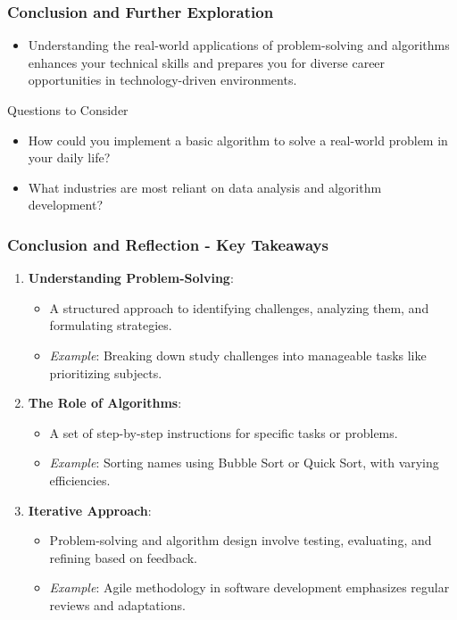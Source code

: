 \documentclass{beamer}
\begin{document}
\begin{frame}[fragile]
    \frametitle{Conclusion and Further Exploration}
    \begin{itemize}
        \item Understanding the real-world applications of problem-solving and algorithms enhances your technical skills and prepares you for diverse career opportunities in technology-driven environments.
    \end{itemize}
    
    \begin{block}{Questions to Consider}
        \begin{itemize}
            \item How could you implement a basic algorithm to solve a real-world problem in your daily life?
            \item What industries are most reliant on data analysis and algorithm development?
        \end{itemize}
    \end{block}
\end{frame}

\begin{frame}[fragile]
    \frametitle{Conclusion and Reflection - Key Takeaways}
    \begin{enumerate}
        \item \textbf{Understanding Problem-Solving}:
        \begin{itemize}
            \item A structured approach to identifying challenges, analyzing them, and formulating strategies.
            \item \textit{Example}: Breaking down study challenges into manageable tasks like prioritizing subjects.
        \end{itemize}
        
        \item \textbf{The Role of Algorithms}:
        \begin{itemize}
            \item A set of step-by-step instructions for specific tasks or problems.
            \item \textit{Example}: Sorting names using Bubble Sort or Quick Sort, with varying efficiencies.
        \end{itemize}
        
        \item \textbf{Iterative Approach}:
        \begin{itemize}
            \item Problem-solving and algorithm design involve testing, evaluating, and refining based on feedback.
            \item \textit{Example}: Agile methodology in software development emphasizes regular reviews and adaptations.
        \end{itemize}
    \end{enumerate}
\end{frame}
\end{document}
